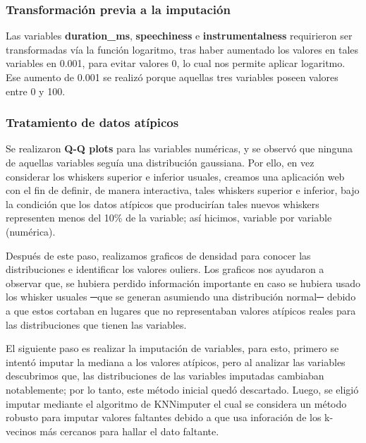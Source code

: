 \documentclass[
  letterpaper,
  DIV=11,
  numbers=noendperiod]{scrartcl}
\begin{document}
\hypertarget{transformaciuxf3n-previa-a-la-imputaciuxf3n}{%
\subsubsection{Transformación previa a la
imputación}\label{transformaciuxf3n-previa-a-la-imputaciuxf3n}}

Las variables \textbf{duration\_ms}, \textbf{speechiness} e
\textbf{instrumentalness} requirieron ser transformadas vía la función
logaritmo, tras haber aumentado los valores en tales variables en 0.001,
para evitar valores 0, lo cual nos permite aplicar logaritmo. Ese
aumento de 0.001 se realizó porque aquellas tres variables poseen
valores entre 0 y 100.

\hypertarget{tratamiento-de-datos-atuxedpicos}{%
\subsubsection{Tratamiento de datos
atípicos}\label{tratamiento-de-datos-atuxedpicos}}

Se realizaron \textbf{Q-Q plots} para las variables numéricas, y se
observó que ninguna de aquellas variables seguía una distribución
gaussiana. Por ello, en vez considerar los whiskers superior e inferior
usuales, creamos una aplicación web con el fin de definir, de manera
interactiva, tales whiskers superior e inferior, bajo la condición que
los datos atípicos que producirían tales nuevos whiskers representen
menos del 10\% de la variable; así hicimos, variable por variable
(numérica).

Después de este paso, realizamos graficos de densidad para conocer las
distribuciones e identificar los valores ouliers. Los graficos nos
ayudaron a observar que, se hubiera perdido información importante en
caso se hubiera usado los whisker usuales ─que se generan asumiendo una
distribución normal─ debido a que estos cortaban en lugares que no
representaban valores atípicos reales para las distribuciones que tienen
las variables.

El siguiente paso es realizar la imputación de variables, para esto,
primero se intentó imputar la mediana a los valores atípicos, pero al
analizar las variables descubrimos que, las distribuciones de las
variables imputadas cambiaban notablemente; por lo tanto, este método
inicial quedó descartado. Luego, se eligió imputar mediante el algoritmo
de KNNimputer el cual se considera un método robusto para imputar
valores faltantes debido a que usa inforación de los k-vecinos más
cercanos para hallar el dato faltante.
\end{document}
